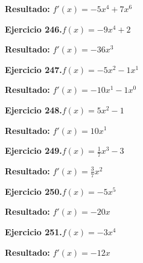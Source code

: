 \documentclass[10pt,a4paper]{article}
\begin{document}
\begin{solbox}
\textbf{Resultado:} \(\displaystyle f'(x) = -5x^{4} + 7x^{6}\)
\end{solbox}

\begin{ejbox}
\textbf{Ejercicio 246.}\quad $f(x) = -9x^{4} +2$
\end{ejbox}

\begin{solbox}
\textbf{Resultado:} \(\displaystyle f'(x) = -36x^{3}\)
\end{solbox}

\newpage
\begin{ejbox}
\textbf{Ejercicio 247.}\quad $f(x) = -5x^{2} -1x^{1}$
\end{ejbox}

\begin{solbox}
\textbf{Resultado:} \(\displaystyle f'(x) = -10x^{1} -1x^{0}\)
\end{solbox}

\begin{ejbox}
\textbf{Ejercicio 248.}\quad $f(x) = 5x^{2} -1$
\end{ejbox}

\begin{solbox}
\textbf{Resultado:} \(\displaystyle f'(x) = 10x^{1}\)
\end{solbox}

\begin{ejbox}
\textbf{Ejercicio 249.}\quad $f(x) = \frac{1}{7}x^{3} -3$
\end{ejbox}

\begin{solbox}
\textbf{Resultado:} \(\displaystyle f'(x) = \frac{3}{7}x^{2}\)
\end{solbox}

\newpage
\begin{ejbox}
\textbf{Ejercicio 250.}\quad $f(x) = -5x^{5}$
\end{ejbox}

\begin{solbox}
\textbf{Resultado:} \(\displaystyle f'(x) = -20x\)
\end{solbox}

\begin{ejbox}
\textbf{Ejercicio 251.}\quad $f(x) = -3x^{4}$
\end{ejbox}

\begin{solbox}
\textbf{Resultado:} \(\displaystyle f'(x) = -12x\)
\end{solbox}
\end{document}
